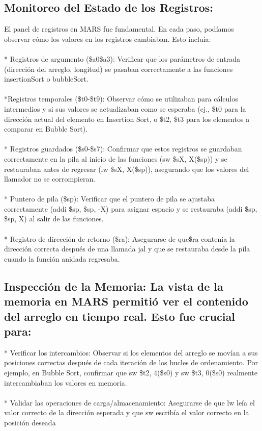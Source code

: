 \documentclass{article}
\begin{document}
\subsection{Monitoreo del Estado de los Registros: }
El panel de registros en MARS fue fundamental. En cada paso, podíamos observar cómo los valores en los registros cambiaban. Esto incluía:
\\
\\* Registros de argumento (\$a0\$a3): Verificar que los parámetros de entrada (dirección del arreglo, longitud) se pasaban correctamente a las funciones insertionSort o bubbleSort.
\\
\\ *Registros temporales (\$t0-\$t9): Observar cómo se utilizaban para cálculos intermedios y si sus valores se actualizaban como se esperaba (ej., \$t0 para la dirección actual del elemento en Insertion Sort, o \$t2, \$t3 para los elementos a comparar en Bubble Sort).
\\
\\* Registros guardados (\$s0-\$s7): Confirmar que estos registros se guardaban correctamente en la pila al inicio de las funciones (sw \$sX, X(\$sp)) y se restauraban antes de regresar (lw \$sX, X(\$sp)), asegurando que los valores del llamador no se corrompieran.
\\
\\* Puntero de pila (\$sp): Verificar que el puntero de pila se ajustaba correctamente (addi \$sp, \$sp, -X) para asignar espacio y se restauraba (addi \$sp, \$sp, X) al salir de las funciones.
\\
\\* Registro de dirección de retorno (\$ra): Asegurarse de que\$ra contenía la dirección correcta después de una llamada jal y que se restauraba desde la pila cuando la función anidada regresaba.
\subsection{Inspección de la Memoria: La vista de la memoria en MARS permitió ver el contenido del arreglo en tiempo real. Esto fue crucial para:}
* Verificar los intercambios: Observar si los elementos del arreglo se movían a sus posiciones correctas después de cada iteración de los bucles de ordenamiento. Por ejemplo, en Bubble Sort, confirmar que sw \$t2, 4(\$s0) y sw \$t3, 0(\$s0) realmente intercambiaban los valores en memoria.
\\
\\* Validar las operaciones de carga/almacenamiento: Asegurarse de que lw leía el valor correcto de la dirección esperada y que sw escribía el valor correcto en la posición deseada
\end{document}
